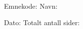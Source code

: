 \clearpage
\thispagestyle{empty}



\begingroup
{}\selectfont

\vspace*{55mm}

Emnekode: \subjectcode
\hspace{40mm}
Navn: \@author

\vspace{20mm}
\begin{huge}
\@title

\vspace{10mm}
\end{huge}
\begin{Large}
\subtitle
\end{Large}
\vspace{20mm}

Dato: \@date
\hspace{40mm}
Totalt antall sider: \pageref{LastPage}

\endgroup

\clearpage
